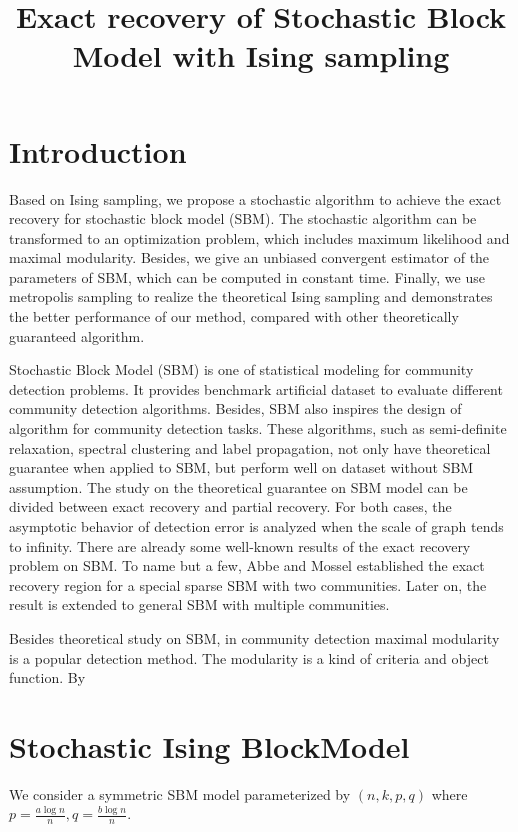 \documentclass{article}
\title{Exact recovery of Stochastic Block Model with Ising sampling}
\begin{document}
	\maketitle
	\section{Introduction}
	Based on Ising sampling, we propose a stochastic algorithm to achieve the exact recovery for stochastic block model (SBM).
	The stochastic algorithm can be transformed to an optimization problem, which includes maximum likelihood and maximal modularity.
	Besides, we give an unbiased convergent estimator of the parameters of SBM, which can be computed in constant time.
	Finally, we use metropolis sampling to realize the theoretical Ising sampling and demonstrates the better performance of our method,
	compared with other theoretically guaranteed algorithm.
	
	Stochastic Block Model (SBM) is one of statistical modeling for community detection problems.
	It provides benchmark artificial dataset to evaluate different community detection algorithms.
	Besides, SBM also inspires the design of algorithm for community detection tasks. These algorithms, such as
	semi-definite relaxation, spectral clustering and label propagation, not only have theoretical guarantee when applied to SBM,
	but perform well on dataset without SBM assumption. The study on the theoretical guarantee on SBM model can be divided between
	exact recovery and partial recovery. For both cases, the asymptotic behavior of detection error
	is analyzed when the scale of graph tends to infinity. There are already some well-known results of the exact recovery problem
	on SBM.	To name but a few, Abbe and Mossel established the exact recovery region for a special sparse SBM with two communities.
	Later on, the result is extended to general SBM with multiple communities.
	
	Besides theoretical study on SBM, in community detection maximal modularity is a popular detection method. The modularity is
	a kind of criteria and object function. By 
	\section{Stochastic Ising BlockModel}\label{sec:sibm}
	We consider a symmetric SBM model parameterized by $(n, k, p, q)$ where $p=\frac{a\log n}{n}, q=\frac{b\log n }{n}$.
	
\end{document}
